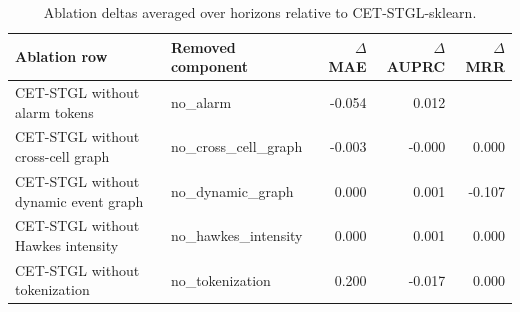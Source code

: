 \begin{table}[t]
\centering
\caption{Ablation deltas averaged over horizons relative to CET-STGL-sklearn.}
\label{tab:ablation_main}
\tiny
\setlength{\tabcolsep}{2pt}
\begin{tabular}{llrrr}
\toprule
Ablation row & Removed component & $\Delta$ MAE & $\Delta$ AUPRC & $\Delta$ MRR \\
\midrule
CET-STGL without alarm tokens & no\_alarm & -0.054 & 0.012 &  \\
CET-STGL without cross-cell graph & no\_cross\_cell\_graph & -0.003 & -0.000 & 0.000 \\
CET-STGL without dynamic event graph & no\_dynamic\_graph & 0.000 & 0.001 & -0.107 \\
CET-STGL without Hawkes intensity & no\_hawkes\_intensity & 0.000 & 0.001 & 0.000 \\
CET-STGL without tokenization & no\_tokenization & 0.200 & -0.017 & 0.000 \\
\bottomrule
\end{tabular}

\end{table}
